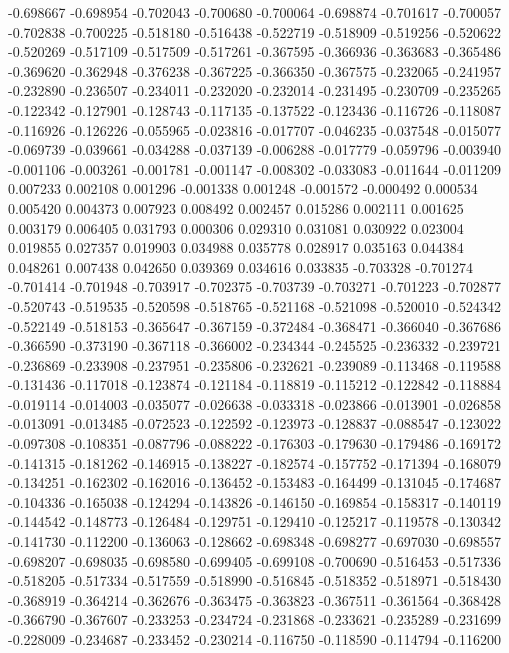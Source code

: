 -0.698667
-0.698954
-0.702043
-0.700680
-0.700064
-0.698874
-0.701617
-0.700057
-0.702838
-0.700225
-0.518180
-0.516438
-0.522719
-0.518909
-0.519256
-0.520622
-0.520269
-0.517109
-0.517509
-0.517261
-0.367595
-0.366936
-0.363683
-0.365486
-0.369620
-0.362948
-0.376238
-0.367225
-0.366350
-0.367575
-0.232065
-0.241957
-0.232890
-0.236507
-0.234011
-0.232020
-0.232014
-0.231495
-0.230709
-0.235265
-0.122342
-0.127901
-0.128743
-0.117135
-0.137522
-0.123436
-0.116726
-0.118087
-0.116926
-0.126226
-0.055965
-0.023816
-0.017707
-0.046235
-0.037548
-0.015077
-0.069739
-0.039661
-0.034288
-0.037139
-0.006288
-0.017779
-0.059796
-0.003940
-0.001106
-0.003261
-0.001781
-0.001147
-0.008302
-0.033083
-0.011644
-0.011209
0.007233
0.002108
0.001296
-0.001338
0.001248
-0.001572
-0.000492
0.000534
0.005420
0.004373
0.007923
0.008492
0.002457
0.015286
0.002111
0.001625
0.003179
0.006405
0.031793
0.000306
0.029310
0.031081
0.030922
0.023004
0.019855
0.027357
0.019903
0.034988
0.035778
0.028917
0.035163
0.044384
0.048261
0.007438
0.042650
0.039369
0.034616
0.033835
-0.703328
-0.701274
-0.701414
-0.701948
-0.703917
-0.702375
-0.703739
-0.703271
-0.701223
-0.702877
-0.520743
-0.519535
-0.520598
-0.518765
-0.521168
-0.521098
-0.520010
-0.524342
-0.522149
-0.518153
-0.365647
-0.367159
-0.372484
-0.368471
-0.366040
-0.367686
-0.366590
-0.373190
-0.367118
-0.366002
-0.234344
-0.245525
-0.236332
-0.239721
-0.236869
-0.233908
-0.237951
-0.235806
-0.232621
-0.239089
-0.113468
-0.119588
-0.131436
-0.117018
-0.123874
-0.121184
-0.118819
-0.115212
-0.122842
-0.118884
-0.019114
-0.014003
-0.035077
-0.026638
-0.033318
-0.023866
-0.013901
-0.026858
-0.013091
-0.013485
-0.072523
-0.122592
-0.123973
-0.128837
-0.088547
-0.123022
-0.097308
-0.108351
-0.087796
-0.088222
-0.176303
-0.179630
-0.179486
-0.169172
-0.141315
-0.181262
-0.146915
-0.138227
-0.182574
-0.157752
-0.171394
-0.168079
-0.134251
-0.162302
-0.162016
-0.136452
-0.153483
-0.164499
-0.131045
-0.174687
-0.104336
-0.165038
-0.124294
-0.143826
-0.146150
-0.169854
-0.158317
-0.140119
-0.144542
-0.148773
-0.126484
-0.129751
-0.129410
-0.125217
-0.119578
-0.130342
-0.141730
-0.112200
-0.136063
-0.128662
-0.698348
-0.698277
-0.697030
-0.698557
-0.698207
-0.698035
-0.698580
-0.699405
-0.699108
-0.700690
-0.516453
-0.517336
-0.518205
-0.517334
-0.517559
-0.518990
-0.516845
-0.518352
-0.518971
-0.518430
-0.368919
-0.364214
-0.362676
-0.363475
-0.363823
-0.367511
-0.361564
-0.368428
-0.366790
-0.367607
-0.233253
-0.234724
-0.231868
-0.233621
-0.235289
-0.231699
-0.228009
-0.234687
-0.233452
-0.230214
-0.116750
-0.118590
-0.114794
-0.116200
